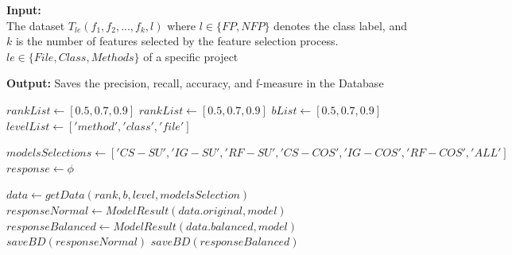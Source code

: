 \begin{algorithm}[H]
    \hspace*{\algorithmicindent} \textbf{Input:} \\ The dataset $T_{le}(f_1, f_2, ..., f_k, l)$ where $l \in \{FP, NFP\}$ denotes the class label, and $k$ is the number of features selected by the feature selection process. $le \in \{File, Class, Methods\}$ of a specific project

    \hspace*{\algorithmicindent} \textbf{Output:} 
        Saves the precision, recall, accuracy, and f-measure in the Database 
    \caption{Execution of models}
    \label{alg:executionmodels}
    \begin{algorithmic}[1]
    \fontsize{12pt}{12pt}\selectfont
    \REQUIRE $rankList \leftarrow [0.5, 0.7, 0.9]$
    \STATE $rankList \leftarrow [0.5, 0.7, 0.9]$
    \STATE $bList \leftarrow [0.5, 0.7, 0.9]$
    \STATE $levelList \leftarrow ['method', 'class', 'file']$

    \STATE $modelsSelections \leftarrow ['CS-SU', 'IG-SU', 'RF-SU', 'CS-COS', 'IG-COS', 'RF-COS', 'ALL']$\;
    \STATE $response \leftarrow \phi$

                \STATE $data \leftarrow getData(rank, b, level, modelsSelection)$\;
                    \STATE $responseNormal \leftarrow ModelResult(data.original, model)$\;
                    \STATE $responseBalanced \leftarrow ModelResult(data.balanced, model)$\;
                    \STATE $saveBD(responseNormal)$\;
                    \STATE $saveBD(responseBalanced)$\;
                \ENDFOR
            \ENDFOR
        \ENDFOR
    \ENDFOR

    \end{algorithmic}
\end{algorithm}

